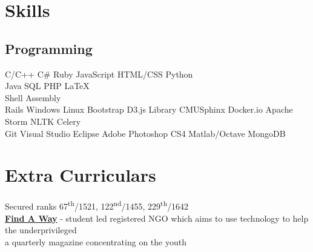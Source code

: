 \documentclass[]{deedy-resume-openfont}
\begin{document}
\begin{minipage}[t]{0.33\textwidth}
\section{Skills}
\subsection{Programming}
C/C++ \textbullet{}   C\# \textbullet{} Ruby \textbullet{} JavaScript \textbullet{} HTML/CSS \textbullet{} Python\\ 
Java \textbullet{} SQL \textbullet{} PHP \textbullet{} \LaTeX\ \\
Shell \textbullet{} Assembly \\
Rails \textbullet{} Windows \textbullet{} Linux \textbullet{} Bootstrap \textbullet{} D3.js Library \textbullet{} CMUSphinx \textbullet{} Docker.io \textbullet{} Apache Storm \textbullet{} NLTK \textbullet{} Celery \\
Git \textbullet{} Visual Studio \textbullet{} Eclipse \textbullet{} Adobe Photoshop CS4 \textbullet{} Matlab/Octave \textbullet{} MongoDB
\sectionsep


\section{Extra Curriculars}
 Secured ranks 67\textsuperscript{th}/1521, 122\textsuperscript{nd}/1455, 229\textsuperscript{th}/1642\\\vspace{6pt}
\vspace{6pt}
 \textbf{\href{http://findaway.in/}{Find A Way}} - student led registered NGO which aims to use technology to help the underprivileged\\\vspace{6pt}
 a quarterly magazine concentrating on the youth



%
%

\end{minipage} 
\end{document}
